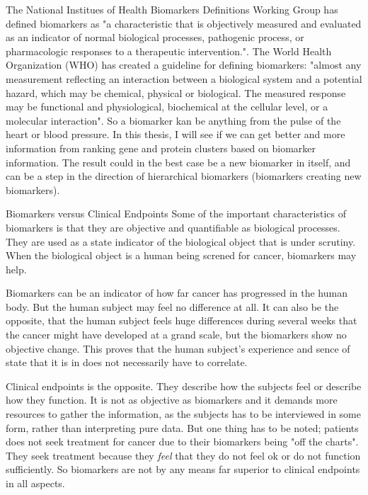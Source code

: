 \documentclass[UKenglish]{ifimaster}
\begin{document}
The National Institues of Health Biomarkers Definitions Working Group has
defined biomarkers as "a characteristic that is objectively measured and
evaluated as an indicator of normal biological processes, pathogenic process, or
pharmacologic responses to a therapeutic intervention.". The World Health
Organization (WHO) has created a guideline for defining biomarkers: "almost any
measurement reflecting an interaction between a biological system and a
potential hazard, which may be chemical, physical or biological. The measured
response may be functional and physiological, biochemical at the cellular level,
or a molecular interaction". So a biomarker kan be anything from the pulse of
the heart or blood pressure. In this thesis, I will see if we can get better and
more information from ranking gene and protein clusters based on biomarker
information. The result could in the best case be a new biomarker in itself, and
can be a step in the direction of hierarchical biomarkers (biomarkers creating
new biomarkers).


Biomarkers versus Clinical Endpoints Some of the important characteristics of
biomarkers is that they are objective and quantifiable as biological processes.
They are used as a state indicator of the biological object that is under
scrutiny. When the biological object is a human being screned for cancer,
biomarkers may help.

Biomarkers can be an indicator of how far cancer has progressed in the human
body. But the human subject may feel no difference at all. It can also be the
opposite, that the human subject feels huge differences during several weeks
that the cancer might have developed at a grand scale, but the biomarkers show
no objective change. This proves that the human subject's experience and sence
of state that it is in does not necessarily have to correlate.

Clinical endpoints is the opposite. They describe how the subjects feel or
describe how they function. It is not as objective as biomarkers and it demands
more resources to gather the information, as the subjects has to be interviewed
in some form, rather than interpreting pure data. But one thing has to be noted;
patients does not seek treatment for cancer due to their biomarkers being "off
the charts". They seek treatment because they \textit{feel} that they do not
feel ok or do not function sufficiently. So biomarkers are not by any means far
superior to clinical endpoints in all aspects.
\end{document}
